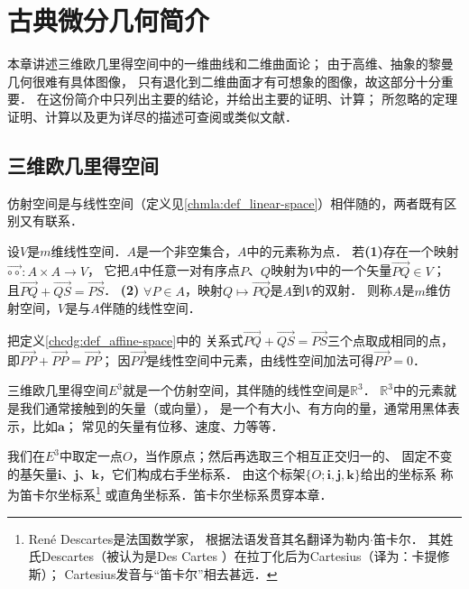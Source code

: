
\chapter{古典微分几何简介} \label{chcdg}

本章讲述三维欧几里得空间中的一维曲线和二维曲面论；
由于高维、抽象的黎曼几何很难有具体图像，
只有退化到二维曲面才有可想象的图像，故这部分十分重要．
在这份简介中只列出主要的结论，并给出主要的证明、计算；
所忽略的定理证明、计算以及更为详尽的描述可查阅\parencite{subq-2016}或类似文献．



\section{三维欧几里得空间}\label{chcdg:sec_E3}

仿射空间是与线性空间（定义见\ref{chmla:def_linear-space}）相伴随的，两者既有区别又有联系．

\begin{definition}\label{chcdg:def_affine-space}
    设$V$是$m$维线性空间．$A$是一个非空集合，$A$中的元素称为{\heiti 点}．
    若{\bfseries (1)}存在一个映射$\overrightarrow{\circ  \circ} : A\times A \to V$，
    它把$A$中任意一对有序点$P$、$Q$映射为$V$中的一个矢量$\overrightarrow{PQ}\in V$；
    且$\overrightarrow{PQ}+\overrightarrow{QS}=\overrightarrow{PS}$．
    {\bfseries (2)} $\forall P\in A$，映射$Q\mapsto\overrightarrow{PQ}$是$A$到$V$的双射．    
    则称$A$是$m$维{\heiti 仿射空间}，$V$是与$A$伴随的线性空间．
\end{definition}


把定义\ref{chcdg:def_affine-space}中的
关系式$\overrightarrow{PQ}+\overrightarrow{QS}=\overrightarrow{PS}$三个点取成相同的点，
即$\overrightarrow{PP}+\overrightarrow{PP}=\overrightarrow{PP}$；
因$\overrightarrow{PP}$是线性空间中元素，由线性空间加法可得$\overrightarrow{PP}=0$．



三维欧几里得空间$E^3$就是一个仿射空间，其伴随的线性空间是$\mathbb{R}^3$．
$\mathbb{R}^3$中的元素就是我们通常接触到的矢量（或向量），
是一个有大小、有方向的量，通常用黑体表示，比如$\boldsymbol{a}$；
常见的矢量有位移、速度、力等等．

我们在$E^3$中取定一点$O$，当作原点；然后再选取三个相互正交归一的、
固定不变的基矢量$\boldsymbol{i}$、$\boldsymbol{j}$、$\boldsymbol{k}$，它们构成右手坐标系．
由这个标架$\{O;\boldsymbol{i},\boldsymbol{j},\boldsymbol{k}\}$给出的坐标系
称为{\heiti 笛卡尔坐标系}{\footnote{Ren\'e Descartes是法国数学家，
		根据法语发音其名翻译为{\heiti 勒内$\cdot$笛卡尔}．
其姓氏Descartes（被认为是Des Cartes ）在拉丁化后为Cartesius（译为：卡提修斯）；
Cartesius发音与“笛卡尔”相去甚远．}}
或{\heiti 直角坐标系}．笛卡尔坐标系贯穿本章．


